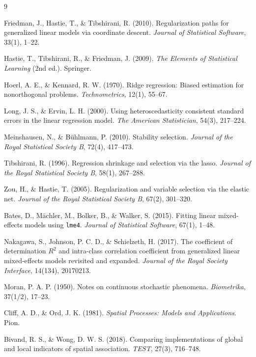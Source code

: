 \documentclass[11pt,a4paper]{article}
\begin{document}
\begin{thebibliography}{9}

  Friedman, J., Hastie, T., \& Tibshirani, R. (2010).
  Regularization paths for generalized linear models via coordinate
  descent. \textit{Journal of Statistical Software}, 33(1), 1--22.

  Hastie, T., Tibshirani, R., \& Friedman, J. (2009).
  \textit{The Elements of Statistical Learning}
  (2nd ed.). Springer.

  Hoerl, A. E., \& Kennard, R. W. (1970).
  Ridge regression: Biased estimation for nonorthogonal problems.
  \textit{Technometrics}, 12(1), 55--67.

  Long, J. S., \& Ervin, L. H. (2000).
  Using heteroscedasticity consistent standard errors in the linear
  regression model. \textit{The American Statistician}, 54(3),
  217--224.

  Meinshausen, N., \& Bühlmann, P. (2010).
  Stability selection. \textit{Journal of the Royal Statistical
  Society B}, 72(4), 417--473.

  Tibshirani, R. (1996).
  Regression shrinkage and selection via the lasso. \textit{Journal
  of the Royal Statistical Society B}, 58(1), 267--288.

  Zou, H., \& Hastie, T. (2005).
  Regularization and variable selection via the elastic net.
  \textit{Journal of the Royal Statistical Society B}, 67(2),
  301--320.

  Bates, D., Mächler, M., Bolker, B., \& Walker, S. (2015).
  Fitting linear mixed-effects models using \texttt{lme4}.
  \textit{Journal of Statistical Software}, 67(1), 1--48.

  Nakagawa, S., Johnson, P. C. D., \& Schielzeth, H. (2017).
  The coefficient of determination \(R^{2}\) and intra-class
  correlation coefficient from generalized linear mixed-effects
  models revisited and expanded.
  \textit{Journal of the Royal Society Interface}, 14(134), 20170213.

  Moran, P. A. P. (1950).
  Notes on continuous stochastic phenomena.
  \textit{Biometrika}, 37(1/2), 17--23.

  Cliff, A. D., \& Ord, J. K. (1981).
  \textit{Spatial Processes: Models and Applications}. Pion.

  Bivand, R. S., \& Wong, D. W. S. (2018).
  Comparing implementations of global and local indicators of
  spatial association.
  \textit{TEST}, 27(3), 716--748.

\end{thebibliography}
\end{document}
